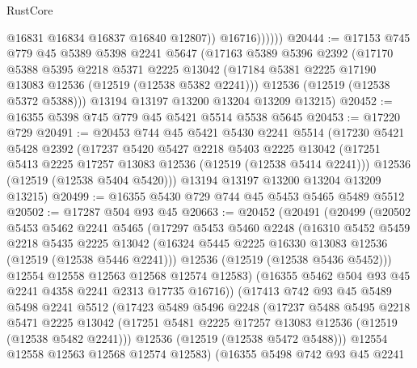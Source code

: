 \begin{lexlean}{RustCore}
\begin{coremodule}
                    @16831
                    @16834
                    @16837
                    @16840
                    @12807))
                @16716))))))
@20444 := @17153
    @745
    @779
    @45
    @5389
    @5398
    @2241
    @5647
    (@17163
      @5389
      @5396
      @2392
      (@17170
        @5388
        @5395
        @2218
        @5371
        @2225
        @13042
        (@17184 @5381 @2225 @17190 @13083 @12536 (@12519 (@12538 @5382 @2241)))
        @12536
        (@12519 (@12538 @5372 @5388)))
      @13194
      @13197
      @13200
      @13204
      @13209
      @13215)
@20452 := @16355 @5398 @745 @779 @45 @5421 @5514 @5538 @5645
@20453 := @17220 @729
@20491 := @20453
    @744
    @45
    @5421
    @5430
    @2241
    @5514
    (@17230
      @5421
      @5428
      @2392
      (@17237
        @5420
        @5427
        @2218
        @5403
        @2225
        @13042
        (@17251 @5413 @2225 @17257 @13083 @12536 (@12519 (@12538 @5414 @2241)))
        @12536
        (@12519 (@12538 @5404 @5420)))
      @13194
      @13197
      @13200
      @13204
      @13209
      @13215)
@20499 := @16355 @5430 @729 @744 @45 @5453 @5465 @5489 @5512
@20502 := @17287 @504 @93 @45
@20663 := @20452
    (@20491
      (@20499
        (@20502
          @5453
          @5462
          @2241
          @5465
          (@17297
            @5453
            @5460
            @2248
            (@16310
              @5452
              @5459
              @2218
              @5435
              @2225
              @13042
              (@16324 @5445 @2225 @16330 @13083 @12536 (@12519 (@12538 @5446 @2241)))
              @12536
              (@12519 (@12538 @5436 @5452)))
            @12554
            @12558
            @12563
            @12568
            @12574
            @12583)
          (@16355 @5462 @504 @93 @45 @2241 @4358 @2241 @2313 @17735 @16716))
        (@17413
          @742
          @93
          @45
          @5489
          @5498
          @2241
          @5512
          (@17423
            @5489
            @5496
            @2248
            (@17237
              @5488
              @5495
              @2218
              @5471
              @2225
              @13042
              (@17251 @5481 @2225 @17257 @13083 @12536 (@12519 (@12538 @5482 @2241)))
              @12536
              (@12519 (@12538 @5472 @5488)))
            @12554
            @12558
            @12563
            @12568
            @12574
            @12583)
          (@16355
            @5498
            @742
            @93
            @45
            @2241

\end{coremodule}
\end{lexlean}
